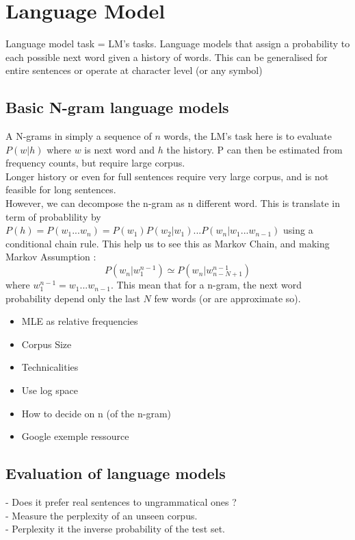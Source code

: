 	\section{Language Model}

		Language model task = LM's tasks.
		Language models that assign a probability to each possible next word given a history of words. This can be generalised for entire sentences or operate at character level (or any symbol)
		\subsection{Basic N-gram language models}

				A N-grams in simply a sequence of $n$ words, the LM's task here is to evaluate $P(w|h)$ where $w$ is next word and $h$ the history. P can then be estimated from frequency counts, but require large corpus.\\
				Longer history or even for full sentences require very large corpus, and is not feasible for long sentences.\\
				However, we can decompose the n-gram as n different word. This is translate in term of probablility by $P(h) = P(w_1 ... w_n) = P(w_1)P(w_2 | w_1)...P(w_n | w_1 ... w_{n-1})$ using a conditional chain rule. This help us to see this as Markov Chain, and making Markov Assumption : \\
				\[
					P(w_n | w_1^{n-1}) \simeq P(w_n | w_{n-N+1}^{n-1})
				\]
				where $w_1^{n-1} = w_1 ... w_{n-1}$. This mean that for a n-gram, the next word probability depend only the last $N$ few words (or are approximate so).

				\begin{itemize}
					\item MLE as relative frequencies
					\item Corpus Size
					\item Technicalities
					\item Use log space
					\item How to decide on n (of the n-gram)
					\item Google exemple ressource
				\end{itemize}
		\subsection{Evaluation of language models}

				- Does it prefer real sentences to ungrammatical ones ?\\
				- Measure the perplexity of an unseen corpus.\\
				- Perplexity it the inverse probability of the test set. 

